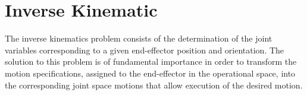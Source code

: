 


\section{Inverse Kinematic}
The inverse kinematics problem consists of the determination of the joint variables corresponding to a given end-effector position and orientation. The solution to this problem is of fundamental importance in order to transform the motion specifications, assigned to the end-effector in the operational space, into the corresponding joint space motions that allow execution of the desired motion.

